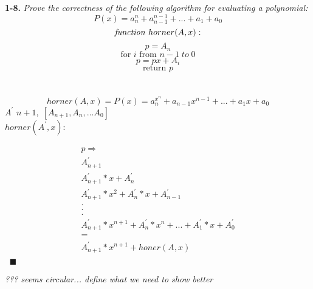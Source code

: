 \textbf{1-8.} \emph{Prove the correctness of the following algorithm for evaluating a polynomial:}
$$P(x) = a_{n}^{n} + a_{n-1}^{n-1} + ... +a_{1} + a_{0}$$ 
$$\text{\emph{function} } horner(A, x):$$  
$$p = A_{n}$$  
$$\text{for } i \text{ from } n - 1 \;to\; 0$$ 
$$p = px + A_{i}$$ 
$$\text{return } p$$ 
\\
\\
$$
	horner(A,x) = P(x) = a_{n}^{x^n} + a_{n-1}x^{n-1} + ... + a_{1}x + a_{0}
$$
$A^{'}$
$n + 1, \; [A_{n+1}, A_{n}, ... A_{0}]$ \\
\textbf{$horner(A^{'}, x) :$}
\begin{flushleft}
\begin{align*}
p \Rightarrow \\
	A^{'}_{n+1} \\
	A^{'}_{n+1}*x + A^{'}_{n} \\
	A^{'}_{n+1}*x^{2} + A^{'}_{n}*x + A^{'}_{n-1} \\
	. \\
	. \\
	. \\
	A^{'}_{n+1}*x^{n+1} + A^{'}_{n}*x^{n} + ... + A^{'}_{1}*x + A^{'}_{0} \\
	= \\
	A^{'}_{n+1}*x^{n+1} + honer(A, x) \\
\end{align*}
$\;\; \blacksquare$
\end{flushleft}
\emph{??? seems circular... define what we need to show better}

 	
 		


